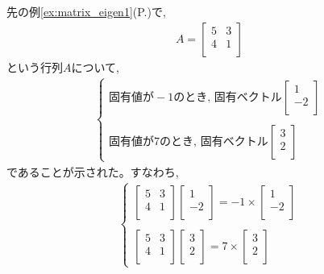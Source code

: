 先の例\ref{ex:matrix_eigen1}(P.\pageref{ex:matrix_eigen1})で, 
\begin{eqnarray}
A=\begin{bmatrix}
5 & 3 \\
4 & 1 \\
\end{bmatrix}\label{eq:matrixA_for_orthog}
\end{eqnarray}
という行列$A$について, 
\begin{eqnarray*}\begin{cases}
\text{固有値が}-1\text{のとき, 固有ベクトル}
\begin{bmatrix}
1 \\
-2 \\
\end{bmatrix}\\
\\
\text{固有値が}7\text{のとき, 固有ベクトル}
\begin{bmatrix}
3 \\
2 \\
\end{bmatrix}
\end{cases}\end{eqnarray*}
であることが示された。すなわち, 
\begin{eqnarray}\begin{cases}
\begin{bmatrix}
5 & 3 \\
4 & 1 \\
\end{bmatrix}
\begin{bmatrix}
1 \\
-2 \\
\end{bmatrix}
=-1\times\begin{bmatrix}
1 \\
-2 \\
\end{bmatrix}\\
\\
\begin{bmatrix}
5 & 3 \\
4 & 1 \\
\end{bmatrix}
\begin{bmatrix}
3 \\
2 \\
\end{bmatrix}
=7\times\begin{bmatrix}
3 \\
2 \\
\end{bmatrix}
\end{cases}\end{eqnarray}
